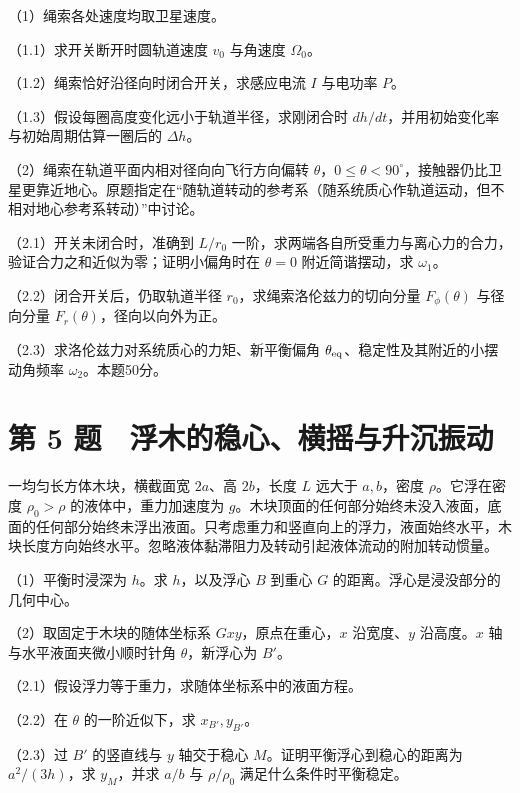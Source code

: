 \documentclass[12pt,a4paper,fontset=fandol]{ctexart}
\begin{document}
（1）绳索各处速度均取卫星速度。

（1.1）求开关断开时圆轨道速度 \(v_0\) 与角速度 \(\Omega_0\)。

（1.2）绳索恰好沿径向时闭合开关，求感应电流 \(I\) 与电功率 \(P\)。

（1.3）假设每圈高度变化远小于轨道半径，求刚闭合时
\(dh/dt\)，并用初始变化率与初始周期估算一圈后的 \(\Delta h\)。

（2）绳索在轨道平面内相对径向向飞行方向偏转
\(\theta\)，\(0\le\theta<90^\circ\)，接触器仍比卫星更靠近地心。原题指定在``随轨道转动的参考系（随系统质心作轨道运动，但不相对地心参考系转动）''中讨论。

（2.1）开关未闭合时，准确到 \(L/r_0\)
一阶，求两端各自所受重力与离心力的合力，验证合力之和近似为零；证明小偏角时在
\(\theta=0\) 附近简谐摆动，求 \(\omega_1\)。

（2.2）闭合开关后，仍取轨道半径 \(r_0\)，求绳索洛伦兹力的切向分量
\(F_\phi(\theta)\) 与径向分量 \(F_r(\theta)\)，径向以向外为正。

（2.3）求洛伦兹力对系统质心的力矩、新平衡偏角
\(\theta_{\rm eq}\)、稳定性及其附近的小摆动角频率
\(\omega_2\)。本题50分。

\clearpage

\section{第 5
题　浮木的稳心、横摇与升沉振动}\label{ux7b2c-5-ux9898-ux6d6eux6728ux7684ux7a33ux5fc3ux6a2aux6447ux4e0eux5347ux6c89ux632fux52a8}

一均匀长方体木块，横截面宽 \(2a\)、高 \(2b\)，长度 \(L\) 远大于
\(a,b\)，密度 \(\rho\)。它浮在密度 \(\rho_0>\rho\)
的液体中，重力加速度为
\(g\)。木块顶面的任何部分始终未没入液面，底面的任何部分始终未浮出液面。只考虑重力和竖直向上的浮力，液面始终水平，木块长度方向始终水平。忽略液体黏滞阻力及转动引起液体流动的附加转动惯量。

（1）平衡时浸深为 \(h\)。求 \(h\)，以及浮心 \(B\) 到重心 \(G\)
的距离。浮心是浸没部分的几何中心。

（2）取固定于木块的随体坐标系 \(Gxy\)，原点在重心，\(x\) 沿宽度、\(y\)
沿高度。\(x\) 轴与水平液面夹微小顺时针角 \(\theta\)，新浮心为 \(B'\)。

（2.1）假设浮力等于重力，求随体坐标系中的液面方程。

（2.2）在 \(\theta\) 的一阶近似下，求 \(x_{B'},y_{B'}\)。

（2.3）过 \(B'\) 的竖直线与 \(y\) 轴交于稳心
\(M\)。证明平衡浮心到稳心的距离为 \(a^2/(3h)\)，求 \(y_M\)，并求 \(a/b\)
与 \(\rho/\rho_0\) 满足什么条件时平衡稳定。
\end{document}
